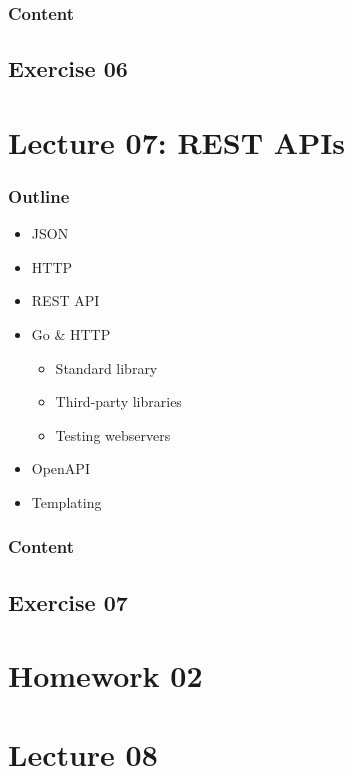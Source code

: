 \documentclass[
  digital,
  color,
  oneside,
  nosansbold,
  nocolorbold,
  lof,
  lot,
]{fithesis4}
\begin{document}
\subsubsection{Content}

\subsection{Exercise 06}

\section{Lecture 07: REST APIs}

\subsubsection{Outline}

\begin{itemize}
    \item JSON
    \item HTTP
    \item REST API
    \item Go \& HTTP
    \begin{itemize}
        \item Standard library
        \item Third-party libraries
        \item Testing webservers
    \end{itemize}
    \item OpenAPI
    \item Templating
\end{itemize}

\subsubsection{Content}

\subsection{Exercise 07}

\section{Homework 02}

\section{Lecture 08}
\end{document}
